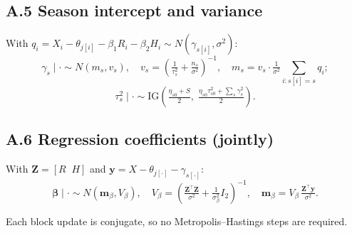 \documentclass[11pt]{article}
\newcommand{\IG}{\mathrm{IG}}
\begin{document}
\subsection*{A.5 Season intercept and variance}
With $q_i = X_i - \theta_{j[i]} - \beta_1 R_i - \beta_2 H_i \sim N(\gamma_{s[i]}, \sigma^2)$:
\[
\gamma_s \mid \cdot \sim N(m_s, v_s),\quad
v_s = \!\left(\tfrac{1}{\tau_s^2} + \tfrac{n_s}{\sigma^2}\right)^{-1},\quad
m_s = v_s\cdot\tfrac{1}{\sigma^2}\!\sum_{i:s[i]=s}\! q_i;
\]
\[
\tau_s^2 \mid \cdot \sim \IG\!\left(\tfrac{\eta_{s0}+S}{2},\;\tfrac{\eta_{s0}\tau_{s0}^2 + \sum_s \gamma_s^2}{2}\right).
\]

\subsection*{A.6 Regression coefficients (jointly)}
With $\mathbf{Z} = [R\;\;H]$ and $\mathbf{y} = X - \theta_{j[\cdot]} - \gamma_{s[\cdot]}$:
\[
\boldsymbol{\beta} \mid \cdot \sim N(\boldsymbol{m}_\beta, V_\beta),\quad
V_\beta = \!\left(\tfrac{\mathbf{Z}^\top \mathbf{Z}}{\sigma^2} + \tfrac{1}{\sigma_\beta^2} I_2\right)^{-1},\quad
\boldsymbol{m}_\beta = V_\beta\,\tfrac{\mathbf{Z}^\top \mathbf{y}}{\sigma^2}.
\]

Each block update is conjugate, so no Metropolis–Hastings steps are required.
\end{document}
